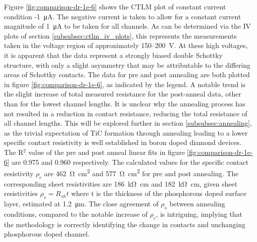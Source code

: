 \begin{refsection}
Figure \ref{fig:comparison-dr-1e-6} shows the CTLM plot of constant current condition -1~\si{\micro\ampere}. The negative current is taken to allow for a constant current magnitude of 1~\si{\micro\ampere} to be taken for all channels. As can be determined via the IV plots of section \ref{subsubsec:ctlm_iv_plots}, this represents the measurements taken in the voltage region of approximately 150--200~\si{\volt}. At these high voltages, it is apparent that the data represent a strongly biased double Schottky structure, with only a slight asymmetry that may be attributable to the differing areas of Schottky contacts. The data for pre and post annealing are both plotted in figure \ref{fig:comparison-dr-1e-6}, as indicated by the legend. A notable trend is the slight increase of total measured resistance for the post-anneal data, other than for the lowest channel lengths. It is unclear why the annealing process has not resulted in a reduction in contact resistance, reducing the total resistance of all channel lengths. This will be explored further in section \ref{subsubsec:annealing}, as the trivial expectation of TiC formation through annealing leading to a lower specific contact resistivity is well established in boron doped diamond devices. The R$^{2}$ value of the pre and post anneal linear fits in figure \ref{fig:comparison-dr-1e-6} are 0.975 and 0.960 respectively. The calculated values for the specific contact resistivity $\rho_{c}$ are 462~\si{\ohm\centi\metre\squared} and 577~\si{\ohm\centi\metre\squared} for pre and post annealing. The corresponding sheet resistivities are 186~\si{\kilo\ohm\centi\metre} and 182~\si{\kilo\ohm\centi\metre}, given sheet resistivities $\rho_{s} = R_{sh}t$ where t is the thickness of the phosphorous doped surface layer, estimated at 1.2~\si{\micro\metre}. The close agreement of $\rho_{s}$ between annealing conditions, compared to the notable increase of $\rho_{c}$, is intriguing, implying that the methodology is correctly identifying the change in contacts and unchanging phosphorous doped channel.


\end{refsection}
